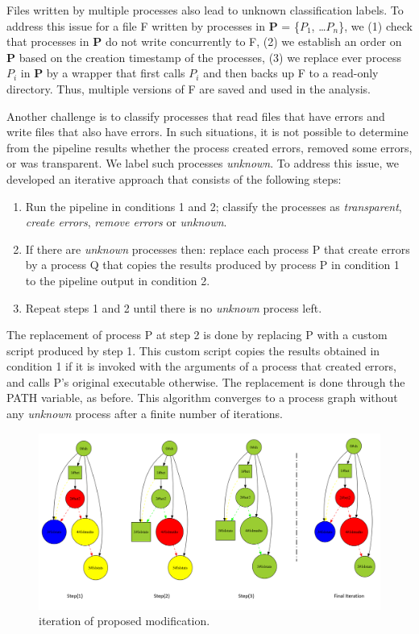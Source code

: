 \documentclass{article}
\begin{document}
Files written by multiple processes also lead to unknown classification 
labels. To address this issue for a file F written by processes in 
\textbf{P} = \{$P_{1}$, \ldots $P_{n}$\}, we (1) check that processes 
in \textbf{P} do not write concurrently to F, (2) we establish an order 
on \textbf{P} based on the creation timestamp of the processes, (3) we 
replace ever process $P_{i}$ in \textbf{P} by a wrapper that first 
calls $P_{i}$ and then backs up F to a read-only directory. Thus, 
multiple versions of F are saved and used in the analysis.

Another challenge is to classify processes that read files that have
errors and write files that also have errors. In such situations, it
is not possible to determine from the pipeline results whether
the process created errors, removed some errors, or was
transparent. We label such processes \emph{unknown}. To address this issue, we developed an iterative approach that consists of the following steps:
\begin{enumerate}
  \item Run the pipeline in conditions 1 and 2; classify the
    processes as \emph{transparent}, \emph{create errors},
    \emph{remove errors} or \emph{unknown}.
  \item If there are \emph{unknown} processes then: replace each process P that create errors by a process Q that
    copies the results produced by process P in condition 1 to the pipeline output in condition 2.
  \item Repeat steps 1 and 2 until there is no \emph{unknown} process left.
\end{enumerate}
The replacement of process P at step 2 is done by replacing P
with a custom script produced by step 1. This custom script
copies the results obtained in condition 1 if it is invoked with the
arguments of a process that created errors, and calls P's original
executable otherwise. The replacement is done through the PATH variable, as before. This algorithm converges to a process graph
without any \emph{unknown} process after a finite number of iterations.

\begin{figure}
  \includegraphics[scale=0.6]{images/iterative_modif}
  \caption{iteration of proposed modification.}
  \label{fig:iterations}
\end{figure}
\end{document}
